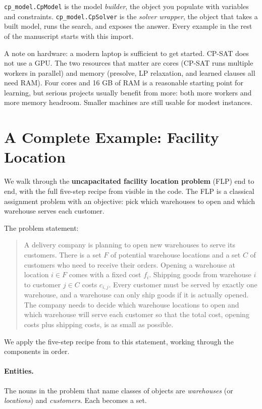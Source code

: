 \lstinline!cp_model.CpModel! is the model \emph{builder},
the object you populate with variables and constraints.
\lstinline!cp_model.CpSolver! is the \emph{solver
wrapper}, the object that takes a built model, runs the search, and
exposes the answer. Every example in the rest of the manuscript starts
with this import.

A note on hardware: a modern laptop is sufficient to get started. CP-SAT
does not use a GPU. The two resources that matter are cores (CP-SAT runs
multiple workers in parallel) and memory (presolve, LP relaxation, and
learned clauses all need RAM). Four cores and 16 GB of RAM is a
reasonable starting point for learning, but serious projects usually
benefit from more: both more workers and more memory headroom.
Smaller machines are still usable for modest instances.

\section{A Complete Example: Facility Location}\label{sec:5.4}

We walk through the \textbf{uncapacitated facility location problem}
(FLP) end to end, with the full five-step recipe from  visible
in the code. The FLP is a classical assignment problem with an
objective: pick which warehouses to open and which warehouse serves each
customer.

The problem statement:

\begin{quote}
A delivery company is planning to open new warehouses to serve its
customers. There is a set \(F\) of potential warehouse locations and a
set \(C\) of customers who need to receive their orders. Opening a
warehouse at location \(i \in F\) comes with a fixed cost \(f_i\).
Shipping goods from warehouse \(i\) to customer \(j \in C\) costs
\(c_{i,j}\). Every customer must be served by exactly one warehouse, and
a warehouse can only ship goods if it is actually opened. The company
needs to decide which warehouse locations to open and which warehouse
will serve each customer so that the total cost, opening costs plus
shipping costs, is as small as possible.
\end{quote}

We apply the five-step recipe from  to this statement, working through the components in order.

\paragraph{Entities.} The nouns in the problem that name classes of objects
are \emph{warehouses} (or \emph{locations}) and \emph{customers}. Each
becomes a set.


